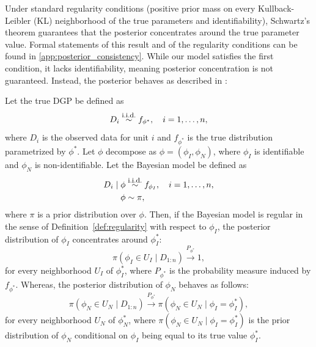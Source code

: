 \documentclass[referee,usenatbib]{biom}
\newcommand{\iid}{\overset{\text{\footnotesize i.i.d.}}{\sim}}
\begin{document}
Under standard regularity conditions (positive prior mass on every Kullback-Leibler (KL) neighborhood of the true parameters and identifiability), Schwartz's theorem \citep{schwartz1965bayes} guarantees that the posterior concentrates around the true parameter value. Formal statements of this result and of the regularity conditions can be found in \ref{app:posterior_consistency}. While our model satisfies the first condition, it lacks identifiability, meaning posterior concentration is not guaranteed. Instead, the posterior behaves as described in \cite{gustafson2010bayesian}:
\begin{theorem}
  Let the true DGP be defined as
  \begin{equation*}
    D_{i} \iid f_{\phi^{*}}, \quad i = 1, \ldots, n,
  \end{equation*}
  where \(D_{i}\) is the observed data for unit \(i\) and \(f_{\phi^{*}}\) is the true distribution parametrized by \(\phi^{*}\). Let \(\phi\) decompose as \(\phi = (\phi_{I}, \phi_{N})\), where \(\phi_{I}\) is identifiable and \(\phi_{N}\) is non-identifiable. Let the Bayesian model be defined as
  \begin{align*}
      D_{i} \mid \phi & \iid f_{\phi_{I}}, \quad i = 1, \ldots, n, \\
      \phi & \sim \pi,
  \end{align*}
  where \(\pi\) is a prior distribution over \(\phi\). Then, if the Bayesian model is regular in the sense of Definition~\ref{def:regularity} with respect to \(\phi_{I}\), the posterior distribution of \(\phi_{I}\) concentrates around \(\phi_{I}^{*}\):
  \begin{equation*}
    \pi \left( \phi_{I} \in U_{I} \mid D_{1:n} \right) \overset{P_{\phi^{*}}}{\to} 1,
  \end{equation*}
  for every neighborhood \(U_{I}\) of \(\phi_{I}^{*}\), where \(P_{\phi^{*}}\) is the probability measure induced by \(f_{\phi^{*}}\). Whereas, the posterior distribution of \(\phi_{N}\) behaves as follows:
  \begin{equation*}
    \pi \left( \phi_{N} \in U_{N} \mid D_{1:n} \right) \overset{P_{\phi^{*}}}{\to} \pi \left( \phi_{N} \in U_{N} \mid \phi_{I} = \phi_{I}^{*} \right),
  \end{equation*}
  for every neighborhood \(U_{N}\) of \(\phi_{N}^{*}\), where \(\pi \left( \phi_{N} \in U_{N} \mid \phi_{I} = \phi_{I}^{*} \right)\) is the prior distribution of \(\phi_{N}\) conditional on \(\phi_{I}\) being equal to its true value \(\phi_{I}^{*}\).
\end{theorem}
\end{document}
